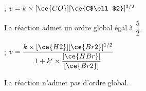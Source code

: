 \begin{enonce}
 ; $v = k \times [\ce{CO}][\ce{C$\ell$2}]^{3/2}$
\end{enonce}


\begin{corrige}
La réaction admet un ordre global égal à $\dfrac{5}{2}$. 
\end{corrige}





\begin{enonce}
 ; $v = \dfrac{k \times [\ce{H2}][\ce{Br2}]^{1/2}}{1 + k' \times \dfrac{[\ce{HBr}]}{[\ce{Br2}]}}$
\end{enonce}


\begin{corrige}
La réaction n'admet pas d'ordre global.
\end{corrige}



\finEntrainement




\newpage




\hauteurLargeurCadreReponse		{10mm}{4cm}
\typeEntrainement				{} %
\initialisationEntrainement

